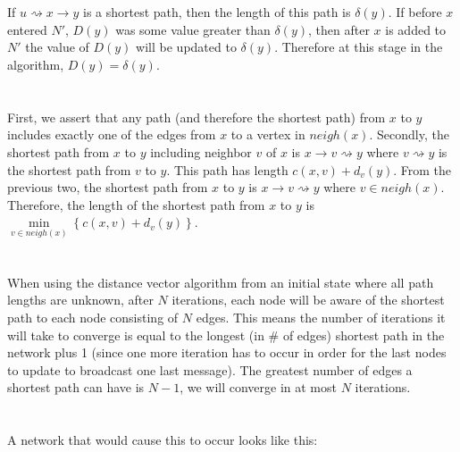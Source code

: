 \documentclass[10pt,a4paper]{article}
\begin{document}
\section{}
If $u\rightsquigarrow x \rightarrow y$ is a shortest path, then the length of this path is $\delta(y)$. If before $x$ entered $N'$, $D(y)$ was some value greater than $\delta(y)$, then after $x$ is added to $N'$ the value of $D(y)$ will be updated to $\delta(y)$. Therefore at this stage in the algorithm, $D(y) = \delta(y)$.
\section{}
First, we assert that any path (and therefore the shortest path) from $x$ to $y$ includes exactly one of the edges from $x$ to a vertex in $neigh(x)$.
Secondly, the shortest path from $x$ to $y$ including neighbor $v$ of $x$ is $x \rightarrow v \rightsquigarrow y$ where $v \rightsquigarrow y$ is the shortest path from $v$ to $y$. This path has length $c(x,v) + d_v(y)$.
From the previous two, the shortest path from $x$ to $y$ is $x \rightarrow v \rightsquigarrow y$ where $v\in neigh(x)$.
Therefore, the length of the shortest path from $x$ to $y$ is $\min\limits_{v\in neigh(x)}\left\{c(x,v) + d_v(y)\right\}$.
\section{}
When using the distance vector algorithm from an initial state where all path lengths are unknown, after $N$ iterations, each node will be aware of the shortest path to each node consisting of $N$ edges. This means the number of iterations it will take to converge is equal to the longest (in # of edges) shortest path in the network plus 1 (since one more iteration has to occur in order for the last nodes to update to broadcast one last message). The greatest number of edges a shortest path can have is $N - 1$, we will converge in at most $N$ iterations.
\section{}
A network that would cause this to occur looks like this:
\end{document}
